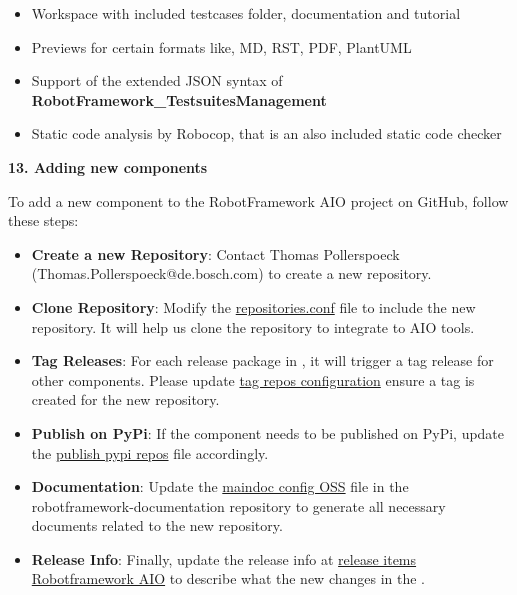 \begin{itemize}
   \item Workspace with included testcases folder, documentation and tutorial
   \item Previews for certain formats like, MD, RST, PDF, PlantUML
   \item Support of the extended JSON syntax of \textbf{RobotFramework\_TestsuitesManagement}
   \item Static code analysis by Robocop, that is an also included static code checker
\end{itemize}


\textbf{13. Adding new components}

To add a new component to the RobotFramework AIO project on GitHub, follow these steps:

\begin{itemize}
   \item \textbf{Create a new Repository}: Contact Thomas Pollerspoeck (Thomas.Pollerspoeck@de.bosch.com) to create a new repository. 

   \item \textbf{Clone Repository}: Modify the 
         \href{https://github.com/test-fullautomation/RobotFramework_AIO/blob/develop/config/repositories/repositories.conf}{repositories.conf} 
         file to include the new repository. It will help us clone the repository to integrate to AIO tools.

   \item \textbf{Tag Releases}: For each release package in \rfw, it will trigger a tag release for other components. Please update 
         \href{https://github.com/test-fullautomation/RobotFramework_AIO/blob/develop/config/repositories/tag_repos.json}{tag repos configuration} ensure 
         a tag is created for the new repository.

   \item \textbf{Publish on PyPi}: If the component needs to be published on PyPi, update the 
         \href{https://github.com/test-fullautomation/RobotFramework_AIO/blob/develop/config/repositories/publish_pypi_repos.txt}{publish pypi repos} 
         file accordingly.

   \item \textbf{Documentation}: Update the 
         \href{https://github.com/test-fullautomation/robotframework-documentation/blob/develop/maindoc/maindoc_configs/maindoc_config_OSS.json}{maindoc config OSS} 
         file in the robotframework-documentation repository to generate all necessary documents related to the new repository.

   \item \textbf{Release Info}: Finally, update the release info at 
         \href{https://github.com/test-fullautomation/RobotFramework_AIO/blob/develop/config/robotframework_aio/release_items_Robotframework_AIO.json}{release items Robotframework AIO} 
         to describe what the new changes in the \rfw.
\end{itemize}

